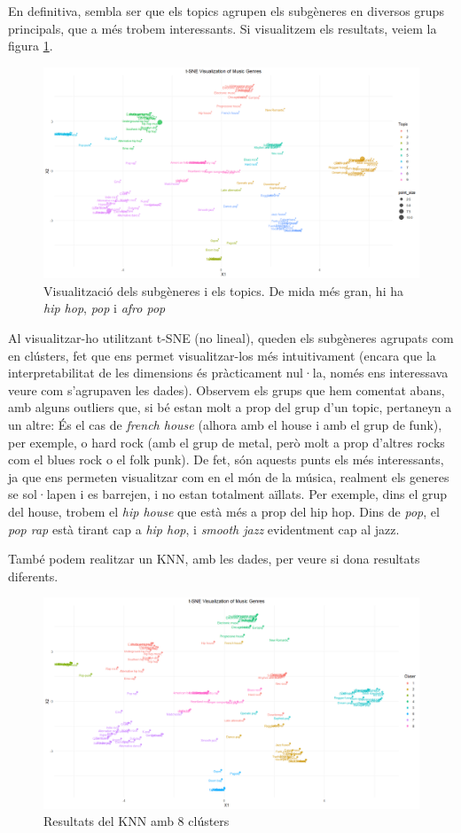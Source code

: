 En definitiva, sembla ser que els topics agrupen els subgèneres en diversos grups principals, que a més trobem interessants. Si visualitzem els resultats, veiem la figura \ref{fig:textual_genres_tsne_topic}.

\begin{figure}[H]
    \centering
    \includegraphics[width=0.7\linewidth]{Images//8_Textual//Genres/genres_tsne_topic_results.png}
    \caption{Visualització dels subgèneres i els topics. De mida més gran, hi ha \textit{hip hop}, \textit{pop} i \textit{afro pop}}
    \label{fig:textual_genres_tsne_topic}
\end{figure}

Al visualitzar-ho utilitzant t-SNE (no lineal), queden els subgèneres agrupats com en clústers, fet que ens permet visualitzar-los més intuitivament (encara que la interpretabilitat de les dimensions és pràcticament nul·la, només ens interessava veure com s'agrupaven les dades). Observem els grups que hem comentat abans, amb alguns outliers que, si bé estan molt a prop del grup d'un topic, pertaneyn a un altre: És el cas de \textit{french house} (alhora amb el house i amb el grup de funk), per exemple, o hard rock (amb el grup de metal, però molt a prop d'altres rocks com el blues rock o el folk punk). De fet, són aquests punts els més interessants, ja que ens permeten visualitzar com en el món de la música, realment els generes se sol·lapen i es barrejen, i no estan totalment aïllats. Per exemple, dins el grup del house, trobem el \textit{hip house} que està més a prop del hip hop. Dins de \textit{pop}, el \textit{pop rap} està tirant cap a \textit{hip hop}, i \textit{smooth jazz} evidentment cap al jazz.

També podem realitzar un KNN, amb les dades, per veure si dona resultats diferents.

\begin{figure}
    \centering
    \includegraphics[width=0.7\linewidth]{Images//8_Textual//Genres/textual_genres_clustering_results.png}
    \caption{Resultats del KNN amb 8 clústers}
    \label{fig:textual_genres_knn}
\end{figure}

